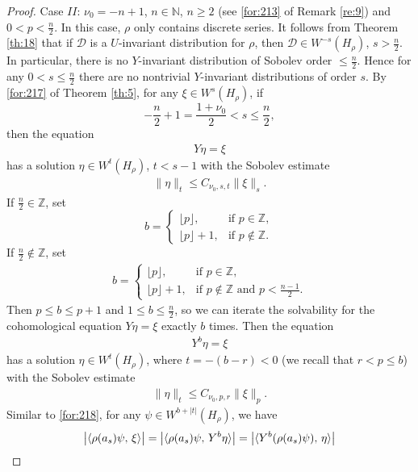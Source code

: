 \documentclass[11 pt]{amsart}
\newcommand{\NN}{\mathbb{N}}
\newcommand{\ZZ}{\mathbb{Z}}
\theoremstyle{definition}
\numberwithin{equation}{section}
\begin{document}
\begin{proof}
\smallskip

Case $II$: $\nu_0=-n+1$, $n\in\NN$, $n\geq2$ (see \eqref{for:213} of Remark \ref{re:9}) and $0<p<\frac{n}{2}$. In this case, $\rho$ only contains discrete series.
It follows from Theorem \ref{th:18} that
if $\mathcal{D}$ is a $U$-invariant distribution for $\rho$, then $\mathcal{D}\in W^{-s}(H_\rho)$, $s>\frac{n}{2}$. In particular, there is no
$Y$-invariant distribution of Sobolev order $\le \frac{n}{2}$. Hence for any
$0<s\le \frac{n}{2}$ there are no nontrivial $Y$-invariant distributions
of order $s$. By \eqref{for:217} of Theorem \ref{th:5}, for any $\xi\in W^s(H_\rho)$, if
\[
-\frac{n}{2}+1=\frac{1+\nu_0}{2}<s\le \frac{n}{2},
\]
then the equation
\begin{align*}
 Y\eta=\xi
\end{align*}
has a solution $\eta\in W^{t}(H_\rho)$, $t<s-1$ with the Sobolev estimate
\begin{align*}
 \|\eta \|_{t} \leq C_{\nu_0,s,t} \| \xi \|_s.
\end{align*}
If $\frac{n}{2}\in\ZZ$,  set
\[
b=
\begin{cases}
\lfloor p\rfloor,& \text{if } p\in\ZZ,\\[4pt]
\lfloor p\rfloor+1,& \text{if } p\notin\ZZ.
\end{cases}
\]
If $\frac{n}{2}\notin\ZZ$,  set
\begin{align*}
b=
\begin{cases}
\lfloor p\rfloor,& \text{if } p\in\ZZ,\\[4pt]
\lfloor p\rfloor+1,& \text{if } p\notin\ZZ\text{ and }p<\frac{n-1}{2}.
\end{cases}
\end{align*}
Then $p\leq b\leq p+1$ and $1\le b\le \frac{n}{2}$, so we can iterate the solvability for the
cohomological equation $Y\eta=\xi$ exactly $b$ times. Then the equation
\begin{align*}
 Y^b\eta=\xi
\end{align*}
has a solution $\eta\in W^{t}(H_\rho)$, where $t=-(b-r)<0$ (we recall that $r<p\le b$) with the Sobolev estimate
\begin{align}\label{for:240}
 \|\eta \|_{t} \leq C_{\nu_0,p,r} \| \xi \|_{p}.
\end{align}
Similar to \eqref{for:218}, for any $\psi\in W^{b+|t|}(H_\rho)$, we have
\begin{align}\label{for:174}
 \big|\langle \rho&(a_s)\psi,\, \xi\rangle \big|=\big|\langle \rho(a_s)\psi,\, Y^b\eta\rangle \big|=\big|\langle Y^b(\rho(a_s)\psi),\, \eta\rangle \big|\notag\\

\end{align}
\end{proof}
\end{document}
